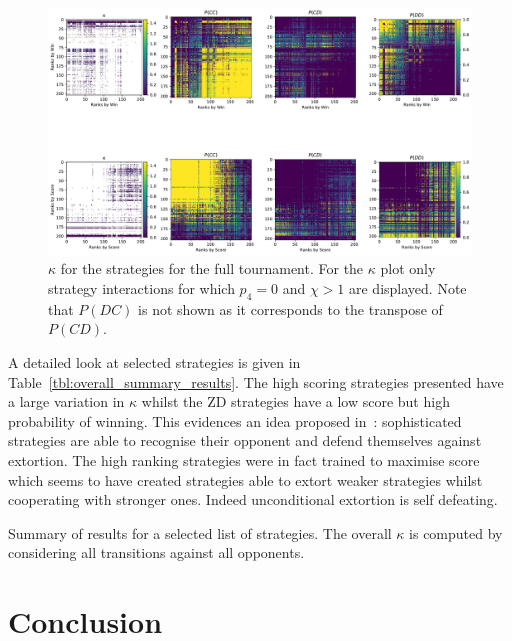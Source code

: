 \documentclass[a4paper]{article}
\begin{document}
\begin{figure}[!htbp]
    \centering
    \includegraphics[width=.95\textwidth]{./assets/img/kappa_and_probabilities_in_full/main.pdf}
    \caption{\(\kappa\) for the strategies for the full
        tournament. For the \(\kappa\) plot only strategy
        interactions for which \(p_4=0\) and \(\chi>1\) are displayed. Note that
        \(P(DC)\) is not shown as it corresponds to the transpose of \(P(CD)\).}
    \label{fig:kappa_and_probabilities_in_full}
\end{figure}

A detailed look at selected strategies is given in
Table~\ref{tbl:overall_summary_results}. The high scoring strategies presented
have a large variation in \(\kappa\) whilst the ZD strategies have a low score
but high probability of winning. This evidences an idea proposed
in~\cite{adami2013evolutionary}: sophisticated strategies are able to recognise
their opponent and defend themselves against extortion.
The high ranking strategies were in fact trained to maximise
score~\cite{Harper2017} which seems to have created strategies able to extort
weaker strategies whilst cooperating with stronger ones. Indeed unconditional
extortion is self defeating.

\begin{table}[!hbtp]
    \begin{center}
    \tiny
    
    \end{center}
    \caption{Summary of results for a selected list of strategies. The overall
             \(\kappa\) is computed by considering all transitions against all
             opponents.}
    \label{tbl:overall_summary_results}
\end{table}

\section{Conclusion}\label{sec:conclusion}
\end{document}

